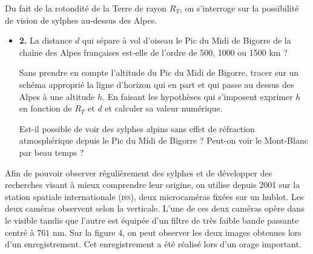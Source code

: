 
Du fait de la rotondité de la Terre de rayon $R_T$, on s'interroge sur la possibilité de vision de sylphes au-dessus des Alpes.


\begin{itemize}
    \item[--] \textbf{2.} La distance $d$ qui sépare à vol d'oiseau le Pic du Midi de Bigorre de la chaîne des Alpes françaises est-elle de l'ordre de 500, 1000 ou 1500 km ?
    
    Sans prendre en compte l'altitude du Pic du Midi de Bigorre, tracer sur un schéma approprié la ligne d'horizon qui en part et qui passe au dessus des Alpes à une altitude $h$. En faisant les hypothèses qui s'imposent exprimer $h$ en fonction de $R_T$ et $d$ et calculer sa valeur numérique.
    
    Est-il possible de voir des sylphes alpins sans effet de réfraction atmosphérique depuis le Pic du Midi de Bigorre ? Peut-on voir le Mont-Blanc par beau temps ?
\end{itemize}

Afin de pouvoir observer régulièrement des sylphes et de développer des recherches visant à mieux comprendre leur origine, on utilise depuis 2001 sur la station spatiale internationale (\textsc{iss}), deux microcaméras fixées sur un hublot. Les deux caméras observent selon la verticale. L'une de ces deux caméras opère dans le visible tandis que l'autre est équipée d'un filtre de très faible bande passante centré à $761\text{ nm}$. Sur la figure 4, on peut observer les deux images obtenues lors d'un enregistrement. Cet enregistrement a été réalisé lors d'un orage important.
